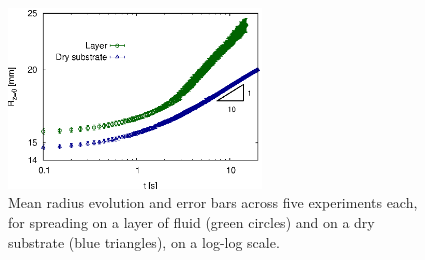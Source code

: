 \documentclass[aip,graphicx]{revtex4-1}
\begin{document}


\begin{figure}[!ht]
\centering
\includegraphics[width=0.6\textwidth]{figures/radius_vs_time_comp_layer_dry.eps}
\caption{Mean radius evolution and error bars across five experiments each, for
  spreading on a layer of fluid (green circles) and on a dry substrate
  (blue triangles), on a log-log
  scale. }
\label{fig:diam_vs_time_comp_layer_dry}
\end{figure}
\end{document}
